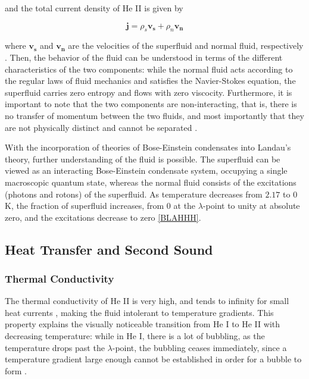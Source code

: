 and the total current density of He II is given by

\begin{equation}
\mathbf{j} = \rho_s\mathbf{v_s} + \rho_n\mathbf{v_n}
\end{equation}

where $\mathbf{v_s}$ and $\mathbf{v_n}$ are the velocities of the
superfluid and normal fluid, respectively \cite{tilley}. Then, the
behavior of the fluid can be understood in terms of the different
characteristics of the two components: while the normal fluid acts
according to the regular laws of fluid mechanics and satisfies the
Navier-Stokes equation, the superfluid carries zero entropy and flows
with zero viscocity. Furthermore, it is important to note that the two
components are non-interacting, that is, there is no transfer of
momentum between the two fluids, and most importantly that they are
not physically distinct and cannot be separated \cite{tilley}.

With the incorporation of theories of Bose-Einstein condensates into
Landau's theory, further understanding of the fluid is possible. The
superfluid can be viewed as an interacting Bose-Einstein condensate
system, occupying a single macroscopic quantum state, whereas the
normal fluid consists of the excitations (photons and rotons) of the
superfluid. As temperature decreases from $2.17$ to $0$ K, the
fraction of superfluid increases, from $0$ at the $\lambda$-point to
unity at absolute zero, and the excitations decrease to zero \ref{BLAHHH}.







\subsection{Heat Transfer and Second Sound}

\subsubsection{Thermal Conductivity}
The thermal conductivity of He II is very high, and tends to infinity
for small heat currents \cite{tilley}, making the fluid intolerant
to temperature gradients. This property explains the visually
noticeable transition from He I to He II with decreasing temperature:
while in He I, there is a lot of bubbling, as the temperature drops
past the $\lambda$-point, the bubbling ceases immediately, since a
temperature gradient large enough cannot be established in order for a
bubble to form \cite{tilley}.


